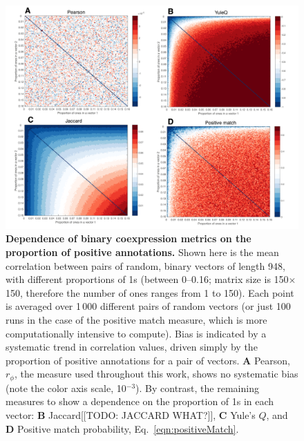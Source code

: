 \documentclass[10pt,letterpaper]{article}
\begin{document}
\begin{figure}[h]
\centering
    \includegraphics[width=1\textwidth]{CoexpressionMeasures.pdf}
\caption{
\label{fig:S_propOnes}
\textbf{Dependence of binary coexpression metrics on the proportion of positive annotations.}
Shown here is the mean correlation between pairs of random, binary vectors of length 948, with different proportions of 1s (between 0--0.16; matrix size is 150$\times$150, therefore the number of ones ranges from 1 to 150).
Each point is averaged over 1\,000 different pairs of random vectors (or just 100 runs in the case of the positive match measure, which is more computationally intensive to compute).
Bias is indicated by a systematic trend in correlation values, driven simply by the proportion of positive annotations for a pair of vectors.
\textbf{A} Pearson, $r_\phi$, the measure used throughout this work, shows no systematic bias (note the color axis scale, 10$^{-3}$).
By contrast, the remaining measures to show a dependence on the proportion of 1s in each vector:
\textbf{B} Jaccard[[TODO: JACCARD WHAT?]],
\textbf{C} Yule's $Q$, and
\textbf{D} Positive match probability, Eq.~\ref{eqn:positiveMatch}.
}
\end{figure}
\end{document}
